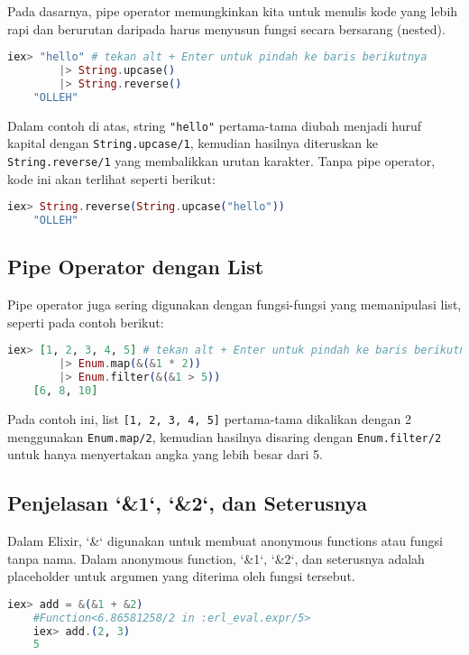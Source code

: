 Pada dasarnya, pipe operator memungkinkan kita untuk menulis kode yang lebih rapi dan berurutan daripada harus menyusun fungsi secara bersarang (nested).

\begin{lstlisting}[language=Elixir]
	iex> "hello" # tekan alt + Enter untuk pindah ke baris berikutnya
		|> String.upcase()
		|> String.reverse()
	"OLLEH"
\end{lstlisting}

Dalam contoh di atas, string \texttt{"hello"} pertama-tama diubah menjadi huruf kapital dengan \texttt{String.upcase/1}, kemudian hasilnya diteruskan ke \texttt{String.reverse/1} yang membalikkan urutan karakter. Tanpa pipe operator, kode ini akan terlihat seperti berikut:

\begin{lstlisting}[language=Elixir]
	iex> String.reverse(String.upcase("hello"))
	"OLLEH"
\end{lstlisting}

\subsection{Pipe Operator dengan List}

Pipe operator juga sering digunakan dengan fungsi-fungsi yang memanipulasi list, seperti pada contoh berikut:

\begin{lstlisting}[language=Elixir]
	iex> [1, 2, 3, 4, 5] # tekan alt + Enter untuk pindah ke baris berikutnya
		|> Enum.map(&(&1 * 2))
		|> Enum.filter(&(&1 > 5))
	[6, 8, 10]
\end{lstlisting}

Pada contoh ini, list \texttt{[1, 2, 3, 4, 5]} pertama-tama dikalikan dengan 2 menggunakan \texttt{Enum.map/2}, kemudian hasilnya disaring dengan \texttt{Enum.filter/2} untuk hanya menyertakan angka yang lebih besar dari 5.

\subsection{Penjelasan `\&1`, `\&2`, dan Seterusnya}

Dalam Elixir, `\&` digunakan untuk membuat anonymous functions atau fungsi tanpa nama. Dalam anonymous function, `\&1`, `\&2`, dan seterusnya adalah placeholder untuk argumen yang diterima oleh fungsi tersebut.

\begin{lstlisting}[language=Elixir]
	iex> add = &(&1 + &2)
	#Function<6.86581258/2 in :erl_eval.expr/5>
	iex> add.(2, 3)
	5
\end{lstlisting}

